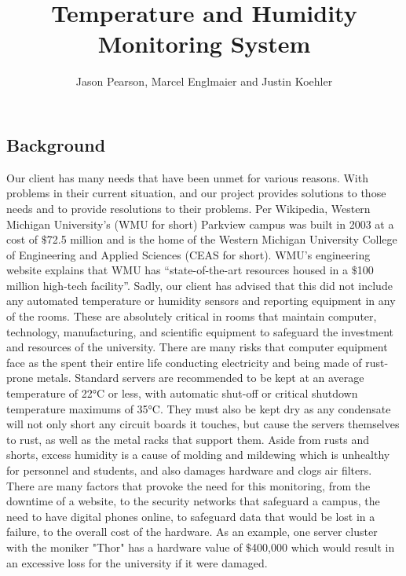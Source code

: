 \documentclass{report}
\begin{document}
\title{Temperature and Humidity Monitoring System}
\author{Jason Pearson, Marcel Englmaier and Justin Koehler}
\maketitle
\tableofcontents
\newpage

\subsection*{Background}
Our client has many needs that have been unmet for various reasons. With problems in their current situation, and our project provides solutions to those needs and to provide resolutions to their problems.
\newline
\indent
  Per Wikipedia, Western Michigan University's (WMU for short) Parkview campus was built in 2003 at a cost of $\$$72.5 million and is the home of the Western Michigan University College of Engineering and Applied Sciences (CEAS for short). 
 WMU’s engineering website explains that WMU has “state-of-the-art resources housed in a $\$$100 million high-tech facility”. 
Sadly, our client has advised that this did not include any automated temperature or humidity sensors and reporting equipment in any of the rooms. 
 These are absolutely critical in rooms that maintain computer, technology, manufacturing, and scientific equipment to safeguard the investment and resources of the university.  There are many risks that computer equipment face as the spent their entire life conducting electricity and being made of rust-prone metals. Standard servers are recommended to be kept at an average temperature of 22°C or less, with automatic shut-off or critical shutdown temperature maximums of 35°C. They must also be kept dry as any condensate will not only short any circuit boards it touches, but cause the servers themselves to rust, as well as the metal racks that support them. Aside from rusts and shorts, excess humidity is a cause of molding and mildewing which is unhealthy for personnel and students, and also damages hardware and clogs air filters. There are many factors that provoke the need for this monitoring, from the downtime of a website, to the security networks that safeguard a campus, the need to have digital phones online, to safeguard data that would be lost in a failure, to the overall cost of the hardware. As an example, one server cluster with the moniker "Thor" has a hardware value of $\$$400,000 which would result in an excessive loss for the university if it were damaged. 
\end{document}
